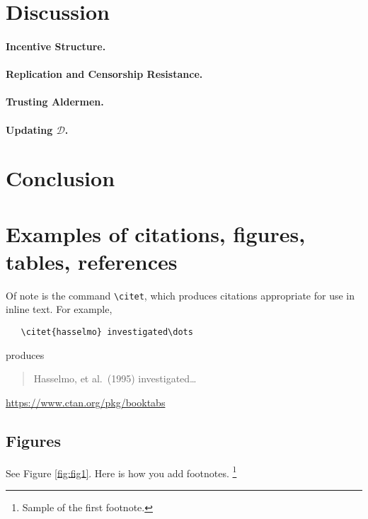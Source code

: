 \documentclass{article}
\begin{document}
\section{Discussion}

\paragraph{Incentive Structure.}

\paragraph{Replication and Censorship Resistance.}

\paragraph{Trusting Aldermen.}

\paragraph{Updating $\mathcal{D}$.}

\section{Conclusion}

\section{Examples of citations, figures, tables, references}
\label{sec:others}
 \cite{permacoin-repurposing-bitcoin-work-for-data-preservation}

Of note is the command \verb+\citet+, which produces citations
appropriate for use in inline text.  For example,
\begin{verbatim}
   \citet{hasselmo} investigated\dots
\end{verbatim}
produces
\begin{quote}
  Hasselmo, et al.\ (1995) investigated\dots
\end{quote}

\begin{center}
  \url{https://www.ctan.org/pkg/booktabs}
\end{center}


\subsection{Figures}
\lipsum[10] 
See Figure \ref{fig:fig1}. Here is how you add footnotes. \footnote{Sample of the first footnote.}
\lipsum[11] 
\end{document}
